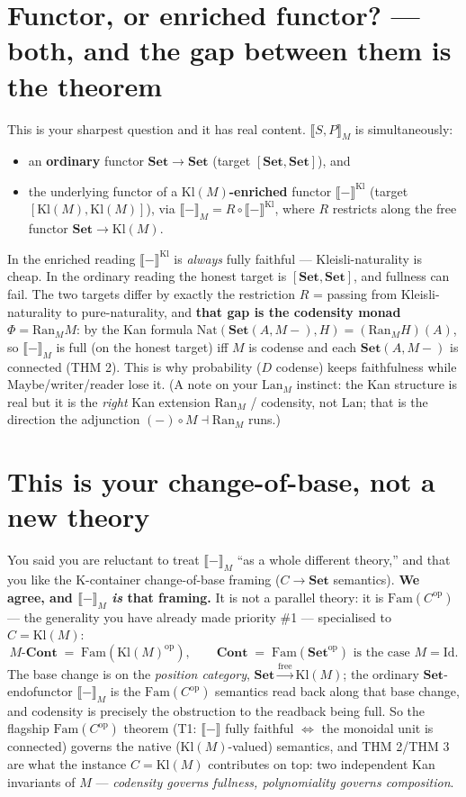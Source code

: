 \documentclass[11pt]{article}
\newcommand{\Set}{\mathbf{Set}}
\newcommand{\Cont}{\mathbf{Cont}}
\newcommand{\Kl}{\mathrm{Kl}}
\newcommand{\Fam}{\mathrm{Fam}}
\newcommand{\ext}[1]{\llbracket #1 \rrbracket}
\newcommand{\Ran}{\mathrm{Ran}}
\newcommand{\Lan}{\mathrm{Lan}}
\newcommand{\Nat}{\mathrm{Nat}}
\theoremstyle{definition}
\begin{document}
\section{Functor, or enriched functor? --- both, and the gap between them is the theorem}
This is your sharpest question and it has real content. $\ext{S,P}_M$ is simultaneously:
\begin{itemize}
  \item an \textbf{ordinary} functor $\Set\to\Set$ (target $[\Set,\Set]$), and
  \item the underlying functor of a \textbf{$\Kl(M)$-enriched} functor $\ext{-}^{\Kl}$
  (target $[\Kl(M),\Kl(M)]$), via $\ext{-}_M = R\circ \ext{-}^{\Kl}$, where $R$ restricts along the free
  functor $\Set\to\Kl(M)$.
\end{itemize}
In the enriched reading $\ext{-}^{\Kl}$ is \emph{always} fully faithful --- Kleisli-naturality is cheap.
In the ordinary reading the honest target is $[\Set,\Set]$, and fullness can fail. The two targets differ
by exactly the restriction $R$ = passing from Kleisli-naturality to pure-naturality, and \textbf{that gap
is the codensity monad} $\Phi=\Ran_M M$: by the Kan formula $\Nat(\Set(A,M-),H)=(\Ran_M H)(A)$, so
$\ext{-}_M$ is full (on the honest target) iff $M$ is codense and each $\Set(A,M-)$ is connected (THM 2).
This is why probability ($D$ codense) keeps faithfulness while $\mathrm{Maybe}$/writer/reader lose it.
(A note on your $\Lan_M$ instinct: the Kan structure is real but it is the \emph{right} Kan extension
$\Ran_M$ / codensity, not $\Lan$; that is the direction the adjunction $(-)\circ M \dashv \Ran_M$ runs.)

\section{This is your change-of-base, not a new theory}
You said you are reluctant to treat $\ext{-}_M$ ``as a whole different theory,'' and that you like the
K-container change-of-base framing ($C\to\Set$ semantics). \textbf{We agree, and $\ext{-}_M$ \emph{is}
that framing.} It is not a parallel theory: it is $\Fam(C^{\mathrm{op}})$ --- the generality you have
already made priority \#1 --- specialised to $C=\Kl(M)$:
\[
  M\text{-}\Cont \;=\; \Fam(\Kl(M)^{\mathrm{op}}),
  \qquad
  \Cont \;=\; \Fam(\Set^{\mathrm{op}}) \text{ is the case } M=\mathrm{Id}.
\]
The base change is on the \emph{position category}, $\Set \xrightarrow{\text{free}} \Kl(M)$; the ordinary
$\Set$-endofunctor $\ext{-}_M$ is the $\Fam(C^{\mathrm{op}})$ semantics read back along that base change,
and codensity is precisely the obstruction to the readback being full. So the flagship $\Fam(C^{\mathrm{op}})$
theorem (T1: $\ext{-}$ fully faithful $\iff$ the monoidal unit is connected) governs the native
($\Kl(M)$-valued) semantics, and THM 2/THM 3 are what the instance $C=\Kl(M)$ contributes on top: two
independent Kan invariants of $M$ --- \emph{codensity governs fullness, polynomiality governs composition}.
\end{document}
